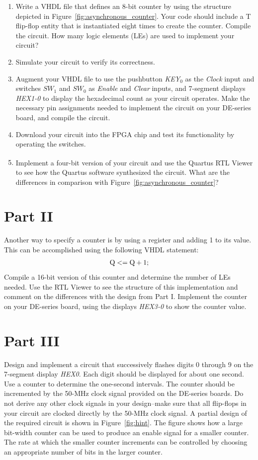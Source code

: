 \documentclass[epsfig,10pt,fullpage]{article}
\begin{document}
\begin{enumerate}
\item Write a VHDL file that defines an 8-bit counter by using the structure
depicted in Figure~\ref{fig:asynchronous_counter}. Your code should include a T 
flip-flop entity that is instantiated
eight times to create the counter. Compile the circuit. How many logic elements (LEs) are 
used to implement your circuit? 
\item Simulate your circuit to verify its correctness.
\item Augment your VHDL file to use the pushbutton {\it KEY}$_0$ as the {\it Clock}
input and switches $SW_1$ and $SW_0$ as {\it Enable} and {\it Clear} inputs, and
7-segment displays {\it HEX1-0} to display the hexadecimal count as your circuit
operates. Make the necessary pin assignments needed to implement the circuit on your
DE-series board, and compile the circuit.
\item Download your circuit into the FPGA chip and test its functionality by operating
the switches.
\item Implement a four-bit version of your circuit and use the Quartus\textsuperscript{\textregistered} RTL Viewer to
see how the Quartus software synthesized the circuit. What are the differences in
comparison with Figure~\ref{fig:asynchronous_counter}?
\end{enumerate}

\section*{Part II}
Another way to specify a counter is by using a register and adding 1 to its value. 
This can be accomplished using the following VHDL statement:
$$
{\rm Q <= Q + 1;}
$$
\noindent
Compile a 16-bit version of this counter and determine the number of LEs needed.  Use the RTL 
Viewer to see the structure of this implementation and comment on the differences with the 
design from Part I. Implement the counter on your DE-series board, using the displays 
{\it HEX3-0} to show the counter value.

\section*{Part III}
Design and implement a circuit that successively flashes digits 0 
through 9 on the 7-segment display {\it HEX0}. Each digit should be 
displayed for about one second. Use a counter to determine the one-second 
intervals. The counter should be incremented by the 50-MHz clock signal 
provided on the DE-series boards. Do not derive any other clock signals in your design--make 
sure that all flip-flops in your circuit are clocked directly by the 50-MHz clock signal.
A partial design of the required circuit is shown in Figure~\ref{fig:hint}. The figure
shows how a large bit-width counter can be used to produce an enable signal for a smaller
counter. The rate at which the smaller counter increments can be controlled by choosing an
appropriate number of bits in the larger counter.
\end{document}
